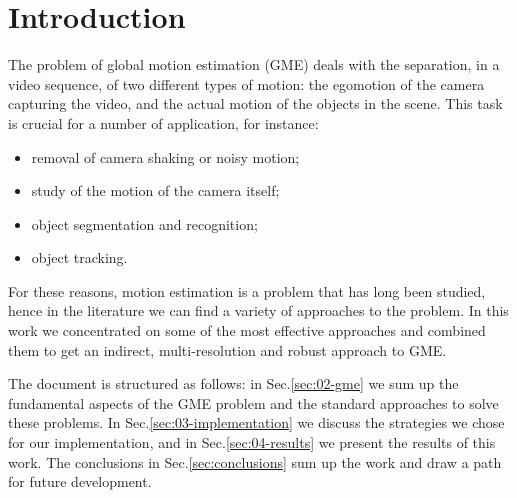 \section{Introduction}
\label{sec:01-intro}
The problem of global motion estimation (GME) deals with the separation, in a video sequence, of two different types of motion: the egomotion of the camera capturing the video, and the actual motion of the objects in the scene. This task is crucial for a number of application, for instance:
\begin{itemize}
    \item removal of camera shaking or noisy motion;
    \item study of the motion of the camera itself;
    \item object segmentation and recognition;
    \item object tracking.
\end{itemize}

For these reasons, motion estimation is a problem that has long been studied, hence in the literature we can find a variety of approaches to the problem. In this work we concentrated on some of the most effective approaches and combined them to get an indirect, multi-resolution and robust approach to GME.

The document is structured as follows: in Sec.\ref{sec:02-gme} we sum up the fundamental aspects of the GME problem and the standard approaches to solve these problems. In Sec.\ref{sec:03-implementation} we discuss the strategies we chose for our implementation, and in Sec.\ref{sec:04-results} we present the results of this work. The conclusions in Sec.\ref{sec:conclusions} sum up the work and draw a path for future development.
